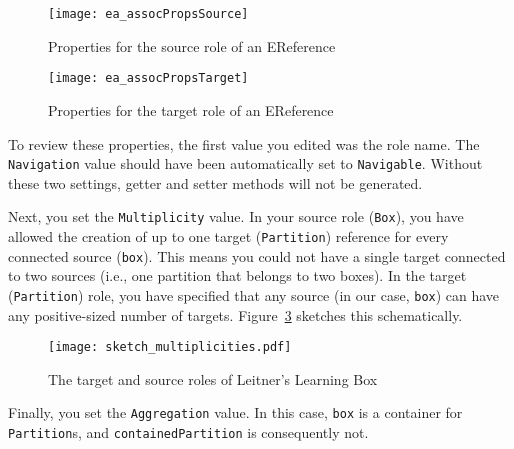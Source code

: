 \begin{itemize}
\vspace{0.5cm}

\begin{figure}[htbp]
	\centering
    \texttt{[image: ea\_assocPropsSource]}
	\caption{Properties for the source role of an EReference}
	\label{fig:role_source}
\end{figure}

\begin{figure}[htbp]
	\centering
	  \texttt{[image: ea\_assocPropsTarget]}
	\caption{Properties for the target role of an EReference}
	\label{fig:role_target}
\end{figure}

\end{itemize}

To review these properties, the first value you edited was the role name. The \texttt{Navigation} value should have been automatically set to
\texttt{Na\-vi\-ga\-ble}. Without these two settings, getter and setter methods will not be generated.

Next, you set the \texttt{Multiplicity} value.  In your source role (\texttt{Box}), you have allowed the creation of up to one target (\texttt{Partition})
reference for every connected source (\texttt{box}). This means you could not have a single target connected to two sources (i.e., one partition that belongs to
two boxes). In the target (\texttt{Partition}) role, you have specified that any source (in our case, \texttt{box}) can have any positive-sized number of targets.
Figure~\ref{fig:sketch_roles} sketches this schematically.

\vspace{0.5cm}

\begin{figure}[htbp]
	\centering
    \texttt{[image: sketch\_multiplicities.pdf]}
	\caption{The target and source roles of Leitner's Learning Box}
	\label{fig:sketch_roles}
\end{figure}
\FloatBarrier

Finally, you set the \texttt{Aggregation} value. In this case, \texttt{box} is a container for \texttt{Partition}s, and \texttt{containedPartition} is
consequently not.


